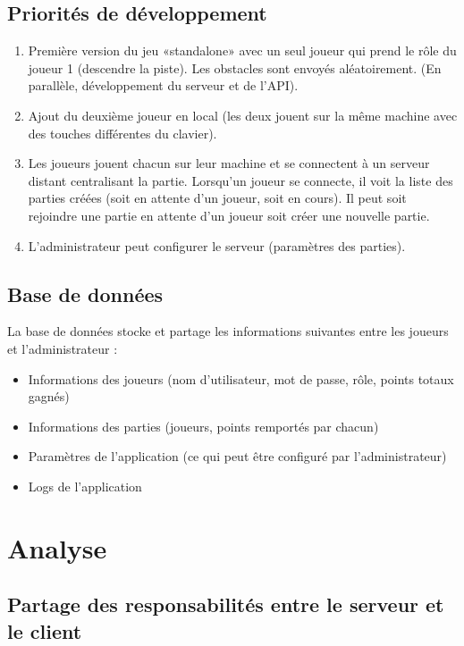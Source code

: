\documentclass[a4paper,12pt]{article}
\begin{document}
	\subsection{Priorités de développement}
	\begin{enumerate}
		\item Première version du jeu «standalone» avec un seul joueur qui prend le rôle du joueur 1 (descendre la piste). Les obstacles sont envoyés aléatoirement. (En parallèle, développement du serveur et de l'API).
		\item Ajout du deuxième joueur en local (les deux jouent sur la même machine avec des touches différentes du clavier).
		\item Les joueurs jouent chacun sur leur machine et se connectent à un serveur distant centralisant la partie. Lorsqu'un joueur se connecte, il voit la liste des parties créées (soit en attente d'un joueur, soit en cours). Il peut soit rejoindre une partie en attente d'un joueur soit créer une nouvelle partie.
		\item L'administrateur peut configurer le serveur (paramètres des parties).
	\end{enumerate}
	
	
	\subsection{Base de données}
	La base de données stocke et partage les informations suivantes entre les joueurs et l'administrateur :
	\begin{itemize}
		\item Informations des joueurs (nom d'utilisateur, mot de passe, rôle, points totaux gagnés)
		\item Informations des parties (joueurs, points remportés par chacun)
		\item Paramètres de l'application (ce qui peut être configuré par l'administrateur)
		\item Logs de l'application
	\end{itemize}
	
	
	\section{Analyse}
	
	
	\subsection{Partage des responsabilités entre le serveur et le client}
	
\end{document}
